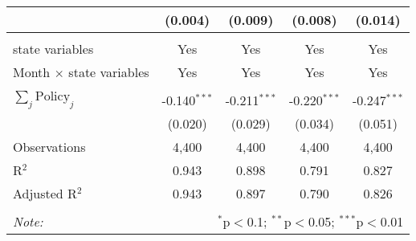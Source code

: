 \begin{tabular}{@{\extracolsep{1pt}}lcccc}
  & (0.004) & (0.009) & (0.008) & (0.014) \\ 
 \hline \\[-1.8ex] 
state variables & Yes & Yes & Yes & Yes \\ 
Month $\times$ state variables & Yes & Yes & Yes & Yes \\ 
\hline \\[-1.8ex] 
$\sum_j \mathrm{Policy}_j$ & -0.140$^{***}$ & -0.211$^{***}$ & -0.220$^{***}$ & -0.247$^{***}$ \\ 
 & (0.020) & (0.029) & (0.034) & (0.051) \\ 
Observations & 4,400 & 4,400 & 4,400 & 4,400 \\ 
R$^{2}$ & 0.943 & 0.898 & 0.791 & 0.827 \\ 
Adjusted R$^{2}$ & 0.943 & 0.897 & 0.790 & 0.826 \\ 
\hline 
\hline \\[-1.8ex] 
\textit{Note:}  & \multicolumn{4}{r}{$^{*}$p$<$0.1; $^{**}$p$<$0.05; $^{***}$p$<$0.01} \\ 
\end{tabular} 